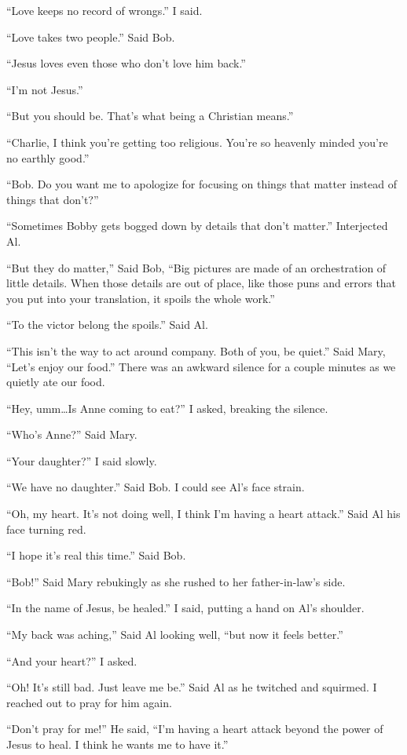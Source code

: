 ``Love keeps no record of wrongs.'' I said.

``Love takes two people.'' Said Bob.

``Jesus loves even those who don't love him back.''

``I'm not Jesus.''

``But you should be. That's what being a Christian means.''

``Charlie, I think you're getting too religious. You're so heavenly minded you're no earthly good.''

``Bob. Do you want me to apologize for focusing on things that matter instead of things that don't?''

``Sometimes Bobby gets bogged down by details that don't matter.'' Interjected Al.

``But they do matter,'' Said Bob, ``Big pictures are made of an orchestration of little details. When those details are out of place, like those puns and errors that you put into your translation, it spoils the whole work.''

``To the victor belong the spoils.'' Said Al.

``This isn't the way to act around company. Both of you, be quiet.'' Said Mary, ``Let's enjoy our food.'' There was an awkward silence for a couple minutes as we quietly ate our food.

``Hey, umm\ldots Is Anne coming to eat?'' I asked, breaking the silence.

``Who's Anne?'' Said Mary.

``Your daughter?'' I said slowly.

``We have no daughter.'' Said Bob. I could see Al's face strain.

``Oh, my heart. It's not doing well, I think I'm having a heart attack.'' Said Al his face turning red.

``I hope it's real this time.'' Said Bob.

``Bob!'' Said Mary rebukingly as she rushed to her father-in-law's side.

``In the name of Jesus, be healed.'' I said, putting a hand on Al's shoulder.

``My back was aching,'' Said Al looking well, ``but now it feels better.''

``And your heart?'' I asked.

``Oh! It's still bad. Just leave me be.'' Said Al as he twitched and squirmed. I reached out to pray for him again.

``Don't pray for me!'' He said, ``I'm having a heart attack beyond the power of Jesus to heal. I think he wants me to have it.''


